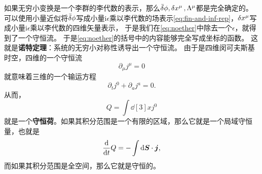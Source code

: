 \documentclass[hyperref, UTF8, a4paper]{ctexart}
\newcommand*{\ii}{\mathrm{i}}
\begin{document}
如果无穷小变换是一个李群的李代数的表示，那么$\bar{\var}{\phi},\var{x^\mu}, \Lambda^\mu$都是完全确定的。可以使用小量近似将$\bar{\var}{\phi}$写成小量$ \ii \epsilon$乘以李代数的场表示\eqref{eq:fin-and-inf-rep}，$\var{x^\mu}$写成小量$\ii \epsilon$乘以李代数的四维矢量表示，
于是我们在\eqref{eq:noether}中除去一个$\epsilon$，就得到了一个守恒流。
于是\eqref{eq:noether}的括号中的内容能够完全写成坐标的函数。
这就是\textbf{诺特定理}：系统的无穷小对称性诱导出一个守恒流。
由于是四维闵可夫斯基时空，四维的一个守恒流
\begin{equation}
    \partial_\mu j^\mu = 0
\end{equation}
就意味着三维的一个输运方程
\begin{equation}
    \partial_t j^0 + \partial_a j^a = 0.
\end{equation}
从而，
\begin{equation}
    Q = \int \dd[3]x j^0
\end{equation}
就是一个\textbf{守恒荷}。如果其积分范围是一个有限的区域，那么它就是一个局域守恒量，也就是
\[
    \dv{t} Q = - \int \dd{\vb*{S}} \cdot \vb*{j},
\]
而如果其积分范围是全空间，那么它就是守恒的。
\end{document}
